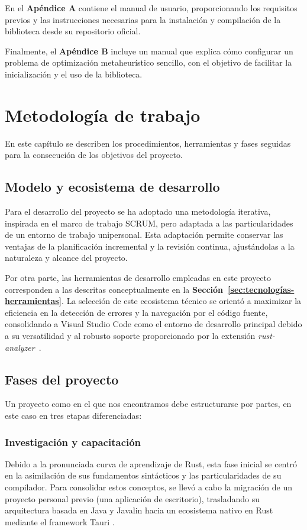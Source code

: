 \documentclass[12pt,a4paper,twoside,openright]{book}
\begin{document}
    En el \textbf{Apéndice A} contiene el manual de usuario, proporcionando los requisitos previos y las instrucciones necesarias para la instalación y compilación de la biblioteca desde su repositorio oficial. 

    Finalmente, el \textbf{Apéndice B} incluye un manual que explica cómo configurar un problema de optimización metaheurístico sencillo, con el objetivo de facilitar la inicialización y el uso de la biblioteca.

\chapter{Metodología de trabajo}
    En este capítulo se describen los procedimientos, herramientas y fases seguidas para la consecución de los objetivos del proyecto.

    \section{Modelo y ecosistema de desarrollo}
        Para el desarrollo del proyecto se ha adoptado una metodología iterativa, inspirada en el marco de trabajo SCRUM, pero adaptada a las particularidades de un entorno de trabajo unipersonal. Esta adaptación permite conservar las ventajas de la planificación incremental y la revisión continua, ajustándolas a la naturaleza y alcance del proyecto. 
        
        Por otra parte, las herramientas de desarrollo empleadas en este proyecto corresponden a las descritas conceptualmente en la \textbf{Sección~\ref{sec:tecnologías-herramientas}}. La selección de este ecosistema técnico se orientó a maximizar la eficiencia en la detección de errores y la navegación por el código fuente, consolidando a Visual Studio Code como el entorno de desarrollo principal debido a su versatilidad y al robusto soporte proporcionado por la extensión \textit{rust-analyzer}~\cite{rust_analyzer}.

    \section{Fases del proyecto}
        Un proyecto como en el que nos encontramos debe estructurarse por partes, en este caso en tres etapas diferenciadas:

    \subsection{Investigación y capacitación}
        Debido a la pronunciada curva de aprendizaje de Rust, esta fase inicial se centró en la asimilación de sus fundamentos sintácticos y las particularidades de su compilador. Para consolidar estos conceptos, se llevó a cabo la migración de un proyecto personal previo (una aplicación de escritorio), trasladando su arquitectura basada en Java y Javalin hacia un ecosistema nativo en Rust mediante el framework Tauri \cite{poker_helper}.
    
\end{document}

